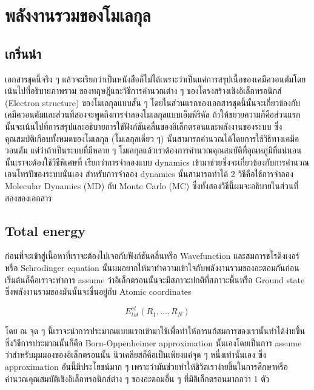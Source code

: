 
\chapter{พลังงานรวมของโมเลกุล}

\section{เกริ่นนำ}

เอกสารชุดนี้จริง ๆ แล้วจะเรียกว่าเป็นหนังสือก็ไม่ได้เพราะว่าเป็นแค่การสรุปเนื้อของเคมีควอนตัมโดยเน้นไปที่อธิบายภาพรวม%
ของทฤษฎีและวิธีการคำนวณต่าง ๆ ของโครงสร้างเชิงอิเล็กทรอนิกส์ (Electron structure) ของโมเลกุลแบบสั้น ๆ 
โดยในส่วนแรกของเอกสารชุดนี้นั้นจะเกี่ยวข้องกับเคมีควอนตัมและส่วนที่สองจะพูดถึงการจำลองโมเลกุลแบบเอ็มพิริคัล 
ถ้าให้ขยายความก็คือส่วนแรกนั้นจะเน้นไปที่การสรุปและอธิบายการใช้ฟังก์ชันคลื่นของอิเล็กตรอนและพลังงานของระบบ%
ซึ่งคุณสมบัติเกือบทั้งหมดของโมเลกุล (โมเลกุลเดี่ยว ๆ) นั้นสามารถคำนวณได้โดยการใช้วิธีทางเคมีควอนตัม 
แต่ว่าถ้าเป็นระบบที่มีหลาย ๆ โมเลกุลแล้วเราต้องการคำนวณคุณสมบัติที่อุณหภูมิที่แน่นอนนั้นเราจะต้องใช้วิธีพิเศษที่%
เรียกว่าการจำลองแบบ dynamics เข้ามาช่วยซึ่งจะเกี่ยวข้องกับการคำนวณเอนโทรปีของระบบนั่นเอง สำหรับการจำลอง 
dynamics นั้นสามารถทำได้ 2 วิธีคือใช้การจำลอง Molecular Dynamics (MD) กับ Monte Carlo (MC)
ซึ่งทั้งสองวิธีนี้ผมจะอธิบายในส่วนที่สองของเอกสาร

\section{Total energy}

ก่อนที่จะเข้าสู่เนื้อหาที่เราจะต้องไปเจอกับฟังก์ชันคลื่นหรือ Wavefunction และสมการชโรดิงเงอร์หรือ Schrodinger 
equation นั้นผมอยากให้มาทำความเข้าใจกับพลังงานรวมของอะตอมกันก่อน เริ่มต้นก็คือเราจะทำการ assume 
ว่าอิเล็กตรอนนั้นจะมีสภาวะปกติที่สภาวะพื้นหรือ Ground state ซึ่งพลังงานรวมของมันนั้นจะขึ้นอยู่กับ Atomic coordinates

\begin{equation}
    E^{el}_{tot}(R_{1}, \dots, R_{N})
\end{equation}

โดย ณ จุด ๆ นี้เราจะนำการประมาณแบบแรกเข้ามาใช้เพื่อทำให้การแก้สมการของเรานั้นทำได้ง่ายขึ้นซึ่งวิธีการประมาณนั้นก็คือ 
Born-Oppenheimer approximation นั้นเองโดยเป็นการ assume ว่าสำหรับมุมมองของอิเล็กตรอนนั้น 
นิวเคลียสก็คือเป็นเพียงแค่จุด ๆ หนึ่งเท่านั้นเอง ซึ่ง approximation อันนี้มีประโยชน์มาก ๆ 
เพราะว่ามันช่วยทำให้ชีวิตเราง่ายขึ้นในการศึกษาหรือคำนวณคุณสมบัติเชิงอิเล็กทรอนิกส์ต่าง ๆ ของอะตอมอื่น ๆ 
ที่มีอิเล็กตรอนมากกว่า 1 ตัว

